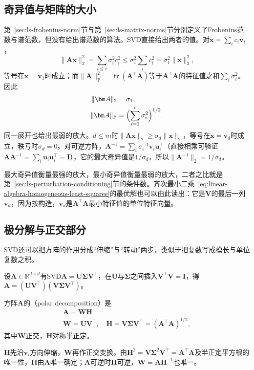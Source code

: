 \subsection{奇异值与矩阵的大小}

第~\ref{sec:ls-frobenius-norm}节与第~\ref{sec:ls-matrix-norms}节分别定义了Frobenius范数与谱范数，但没有给出谱范数的算法。SVD直接给出两者的值。对$\bm x=\sum_ic_i\bm v_i$，
\[
 \lVert\bm A\bm x\rVert_2^2=\sum_{i\leq r}\sigma_i^2c_i^2\leq\sigma_1^2\sum_ic_i^2=\sigma_1^2\lVert\bm x\rVert_2^2 ,
\]
等号在$\bm x=\bm v_1$时成立；而$\lVert\bm A\rVert_{\mathrm F}^2=\operatorname{tr}(\bm A^\top\bm A)$等于$\bm A^\top\bm A$的特征值之和$\sum_i\sigma_i^2$。因此
\begin{align}
 \lVert\bm A\rVert_2&=\sigma_1,
 \label{eq:matrix-analysis-spectral-norm}\\
 \lVert\bm A\rVert_{\mathrm F}&=\Bigl(\sum_{i=1}^r\sigma_i^2\Bigr)^{1/2}.
 \label{eq:matrix-analysis-frobenius-norm}
\end{align}
同一展开也给出最弱的放大。$d\leq m$时$\lVert\bm A\bm x\rVert_2\geq\sigma_d\lVert\bm x\rVert_2$，等号在$\bm x=\bm v_d$时成立，秩亏时$\sigma_d=0$。对可逆方阵，$\bm A^{-1}=\sum_i\sigma_i^{-1}\bm v_i\bm u_i^\top$（直接相乘可验证$\bm A\bm A^{-1}=\sum_i\bm u_i\bm u_i^\top=\bm I$），它的最大奇异值是$1/\sigma_d$，所以$\lVert\bm A^{-1}\rVert_2=1/\sigma_d$。

最大奇异值衡量最强的放大，最小奇异值衡量最弱的放大，二者之比就是第~\ref{sec:ls-perturbation-conditioning}节的条件数。齐次最小二乘~\eqref{eq:linear-algebra-homogeneous-least-squares}的最优解也可以由此读出：它是$\bm V$的最后一列$\bm v_d$，因为按构造，$\bm v_d$是$\bm A^\top\bm A$最小特征值的单位特征向量。

\subsection{极分解与正交部分}

SVD还可以把方阵的作用分成“伸缩”与“转动”两步，类似于把复数写成模长与单位复数之积。

设$\bm A\in\mathbb R^{d\times d}$有SVD$\bm A=\bm U\bm\Sigma\bm V^\top$，在$\bm U$与$\bm\Sigma$之间插入$\bm V^\top\bm V=\bm I$，得$\bm A=(\bm U\bm V^\top)(\bm V\bm\Sigma\bm V^\top)$。
\begin{definition}[极分解]
\label{def:matrix-analysis-polar-decomposition}
方阵$\bm A$的（polar decomposition）是
\begin{equation}
\begin{gathered}
\bm A=\bm W\bm H\\
\bm W=\bm U\bm V^\top,\quad \bm H=\bm V\bm\Sigma\bm V^\top=(\bm A^\top\bm A)^{1/2},
\end{gathered}
\label{eq:matrix-analysis-polar-decomposition}
\end{equation}
其中$\bm W$正交，$\bm H$对称半正定。
\end{definition}
$\bm H$先沿$\bm v_i$方向伸缩，$\bm W$再作正交变换。由$\bm H^2=\bm V\bm\Sigma^2\bm V^\top=\bm A^\top\bm A$及半正定平方根的唯一性，$\bm H$由$\bm A$唯一确定；$\bm A$可逆时$\bm H$可逆，$\bm W=\bm A\bm H^{-1}$也唯一。


